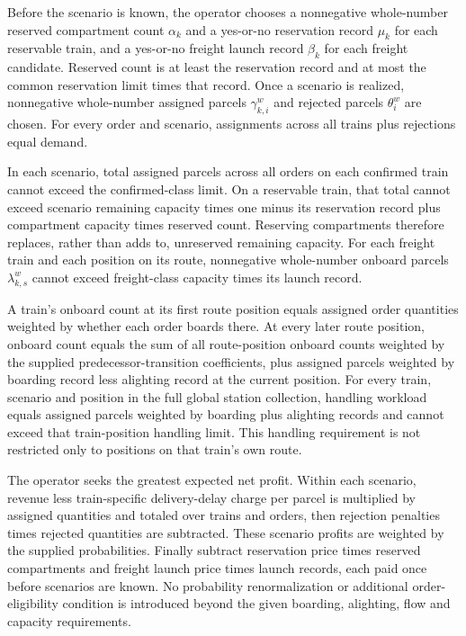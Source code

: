 \documentclass[10pt]{article}
\begin{document}
Before the scenario is known, the operator chooses a nonnegative whole-number reserved compartment count $\alpha_k$ and a yes-or-no reservation record $\mu_k$ for each reservable train, and a yes-or-no freight launch record $\beta_k$ for each freight candidate. Reserved count is at least the reservation record and at most the common reservation limit times that record. Once a scenario is realized, nonnegative whole-number assigned parcels $\gamma^w_{k,i}$ and rejected parcels $\theta_i^w$ are chosen. For every order and scenario, assignments across all trains plus rejections equal demand.

In each scenario, total assigned parcels across all orders on each confirmed train cannot exceed the confirmed-class limit. On a reservable train, that total cannot exceed scenario remaining capacity times one minus its reservation record plus compartment capacity times reserved count. Reserving compartments therefore replaces, rather than adds to, unreserved remaining capacity. For each freight train and each position on its route, nonnegative whole-number onboard parcels $\lambda^w_{k,s}$ cannot exceed freight-class capacity times its launch record.

A train's onboard count at its first route position equals assigned order quantities weighted by whether each order boards there. At every later route position, onboard count equals the sum of all route-position onboard counts weighted by the supplied predecessor-transition coefficients, plus assigned parcels weighted by boarding record less alighting record at the current position. For every train, scenario and position in the full global station collection, handling workload equals assigned parcels weighted by boarding plus alighting records and cannot exceed that train-position handling limit. This handling requirement is not restricted only to positions on that train's own route.

The operator seeks the greatest expected net profit. Within each scenario, revenue less train-specific delivery-delay charge per parcel is multiplied by assigned quantities and totaled over trains and orders, then rejection penalties times rejected quantities are subtracted. These scenario profits are weighted by the supplied probabilities. Finally subtract reservation price times reserved compartments and freight launch price times launch records, each paid once before scenarios are known. No probability renormalization or additional order-eligibility condition is introduced beyond the given boarding, alighting, flow and capacity requirements.
\end{document}
